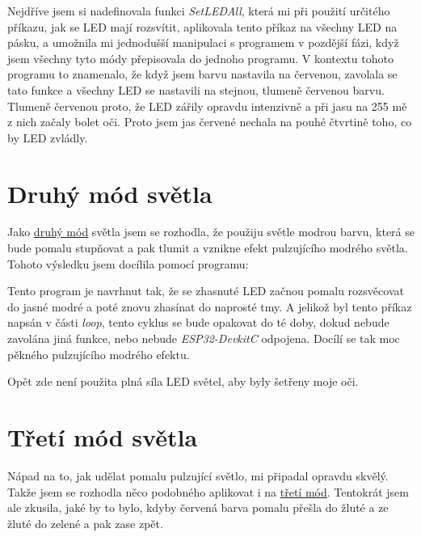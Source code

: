 Nejdříve jsem si nadefinovala funkci \emph{SetLEDAll}, která mi při použití určitého příkazu, jak se LED mají rozsvítit, aplikovala tento příkaz na všechny LED na pásku, a umožnila mi jednodušší manipulaci s programem v pozdější fázi, když jsem všechny tyto módy přepisovala do jednoho programu. 
V kontextu tohoto programu to znamenalo, že když jsem barvu nastavila na červenou, zavolala se tato funkce a všechny LED se nastavili na stejnou, tlumeně červenou barvu. Tlumeně červenou proto, že LED zářily opravdu intenzivně a při jasu na 255 mě z nich začaly bolet oči. Proto jsem jas červené nechala na pouhé čtvrtině toho, co by LED zvládly.



\section{Druhý mód světla}
Jako \href{https://github.com/Nemesis-Rain/Supplements-/blob/main/4-barevne-mody/blikani-dva.cpp}{druhý mód} světla jsem se rozhodla, že použiju světle modrou barvu, která se bude pomalu stupňovat a pak tlumit a vznikne efekt pulzujícího modrého světla. Tohoto výsledku jsem docílila pomocí programu: 


%


Tento program je navrhnut tak, že se zhasnuté LED začnou pomalu rozsvěcovat do jasné modré a poté znovu zhasínat do naprosté tmy. A jelikož byl tento příkaz napsán v části \emph{loop}, tento cyklus se bude opakovat do té doby, dokud nebude zavolána jiná funkce, nebo nebude \emph{ESP32-DevkitC} odpojena. Docílí se tak moc pěkného pulzujícího modrého efektu. 

Opět zde není použita plná síla LED světel, aby byly šetřeny moje oči.  

\section{Třetí mód světla}
Nápad na to, jak udělat pomalu pulzující světlo, mi připadal opravdu skvělý. Takže jsem se rozhodla něco podobného aplikovat i na \href{https://github.com/Nemesis-Rain/Supplements-/blob/main/4-barevne-mody/blikani-tri.cpp}{třetí mód}. Tentokrát jsem ale zkusila, jaké by to bylo, kdyby červená barva pomalu přešla do žluté a ze žluté do zelené a pak zase zpět.


